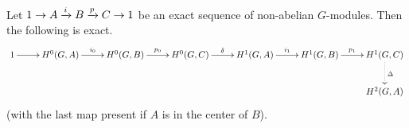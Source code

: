 \begin{thm}
Let $1\to A\xrightarrow{i} B \xrightarrow{p} C\to 1$ be an exact sequence of non-abelian $G$-modules. Then the following is exact.
\[
\xymatrix{
1\ar[r] & H^0(G,A) \ar[r]^{i_0} & H^0(G,B) \ar[r]^{p_0} & H^0(G,C) \ar[r]^{\de} & H^1(G,A) \ar[r]^{i_1} & H^1(G,B) \ar[r]^{p_1} & H^1(G,C) \ar@{.>}[d]^{\De}\\
&&&&& & H^2(G,A)
}
\]
(with the last map present if $A$ is in the center of $B$).
\end{thm}